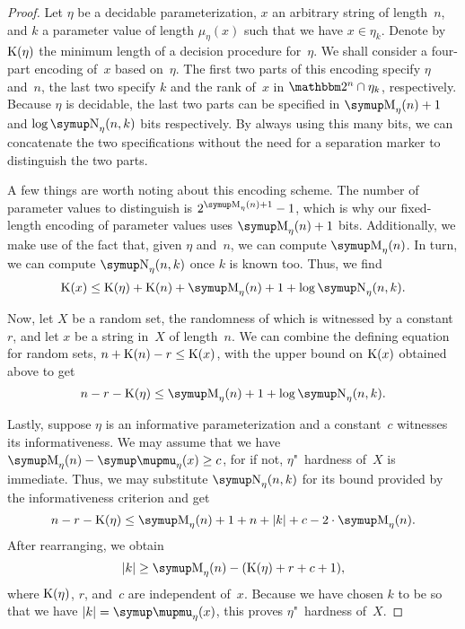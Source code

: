 \begin{proof}
  Let $\eta$ be a decidable parameterization, $x$ an arbitrary string of length~$n$, and $k$ a parameter value of length $\mu_\eta(x)$ such that we have $x \in \eta_k$.
  Denote by $\operatorname{K}(\eta)$ the minimum length of a decision procedure for~$\eta$.
  We shall consider a four-part encoding of~$x$ based on~$\eta$.
  The first two parts of this encoding specify $\eta$ and~$n$, the last two specify $k$ and the rank of~$x$ in $\binary^n \cap \eta_k$, respectively.
  Because $\eta$ is decidable, the last two parts can be specified in $\upM_\eta(n) + 1$ and $\log \upN_\eta(n, k)$ bits respectively.
  By always using this many bits, we can concatenate the two specifications without the need for a separation marker to distinguish the two parts.

  A few things are worth noting about this encoding scheme.
  The number of parameter values to distinguish is $2^{\upM_\eta(n) + 1} - 1$, which is why our fixed-length encoding of parameter values uses $\upM_\eta(n) + 1$ bits.
  Additionally, we make use of the fact that, given $\eta$ and~$n$, we can compute $\upM_\eta(n)$.
  In turn, we can compute $\upN_\eta(n, k)$ once $k$ is known too.
  Thus, we find
  \begin{equation*}
    \KC(x) \le \KC(\eta) + \KC(n) + \upM_\eta(n) + 1 + \log \upN_\eta(n, k).
  \end{equation*}

  Now, let $X$ be a random set, the randomness of which is witnessed by a constant~$r$, and let $x$ be a string in~$X$ of length~$n$.
  We can combine the defining equation for random sets, $n + \operatorname{K}(n) - r \le \operatorname{K}(x)$, with the upper bound on $\operatorname{K}(x)$ obtained above to get
  \begin{equation*}
    n - r - \KC(\eta) \le \upM_\eta(n) + 1+ \log \upN_\eta(n, k).
  \end{equation*}

  Lastly, suppose $\eta$ is an informative parameterization and a constant~$c$ witnesses its informativeness.
  We may assume that we have $\upM_\eta(n) - \mu_\eta(x) \ge c$, for if not, $\eta$"~hardness of~$X$ is immediate.
  Thus, we may substitute $\upN_\eta(n, k)$ for its bound provided by the informativeness criterion and get
  \begin{equation*}
    n - r - \KC(\eta) \le \upM_\eta(n) + 1 + n + \length{k} + c - 2 \cdot \upM_\eta(n).
  \end{equation*}
  After rearranging, we obtain
  \begin{equation*}
    \length{k} \ge \upM_\eta(n) - (\KC(\eta) + r + c + 1),
  \end{equation*}
  where $\operatorname{K}(\eta)$, $r$, and~$c$ are independent of~$x$.
  Because we have chosen $k$ to be so that we have $\length{k} = \mu_\eta(x)$, this proves $\eta$"~hardness of~$X$.
\end{proof}

